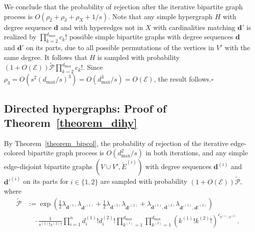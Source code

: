 \documentclass{article}
\theoremstyle{plain}
\theoremstyle{remark}
\theoremstyle{plain}
\numberwithin{equation}{section}
\renewcommand{\d}{{\boldsymbol{d}}}
\begin{document}
	We conclude that the probability of rejection after the iterative bipartite graph process is $O(\rho_2+\rho_3+\rho_X+1/s)$. Note that any simple hypergraph $H$ with degree sequence $\d$ and with hyperedges not in $X$ with cardinalities matching $\d'$ is realized by $\prod_{k=2}^{d_{\max}}c_k!$ possible simple bipartite graphs with degree sequences $\d$ and $\d'$ on its parts, due to all possible permutations of the vertices in $V'$ with the same degree. It follows that $H$ is sampled with probability $(1+O(\mathscr{E}))\widetilde{\mathscr{P}}\prod_{k=2}^{d_{\max}}c_k!$. Since $\rho_3=O(s^2(d_{\max}/s)^3)=O(d_{\max}^3/s)=O(\mathscr{E})$, the result follows.\hfill$\square$
	
	\subsection{Directed hypergraphs: Proof of Theorem~\ref{theorem_dihy}}\label{subsection_applications_dihy}
	
	By Theorem~\ref{theorem_bipcol}, the probability of rejection of the iterative edge-colored bipartite graph process is $O(d_{\max}^2/s)$ in both iterations, and any simple edge-disjoint bipartite graphs $(V\cup V',\widetilde{E}^{(i)})$ with degree sequences $\d^{(i)}$ and $\d'^{(i)}$ on its parts for $i\in\{1,2\}$ are sampled with probability $(1+O(\mathscr{E}))\widetilde{\mathscr{P}}$, where
	\begin{align}
		\widetilde{\mathscr{P}}&:=\exp\left(\tfrac12\lambda_{\d^{(1)}}\lambda_{\d'^{(1)}}+\tfrac12\lambda_{\d^{(2)}}\lambda_{\d'^{(2)}}+\lambda_{\d^{(1)},\d^{(2)}}\lambda_{\d'^{(1)},\d'^{(2)}}\right)
		\\&\quad\cdot\frac1{s^{(1)}!s^{(2)}!}\prod_{i=1}^{n}d_i^{(1)}!d_i^{(2)}!\prod_{k^{(1)}=1}^{d_{\max}}\prod_{k^{(2)}=1}^{d_{\max}}(k^{(1)}!k^{(2)}!)^{c_{k^{(1)},k^{(2)}}}.
	\end{align}
	
\end{document}
